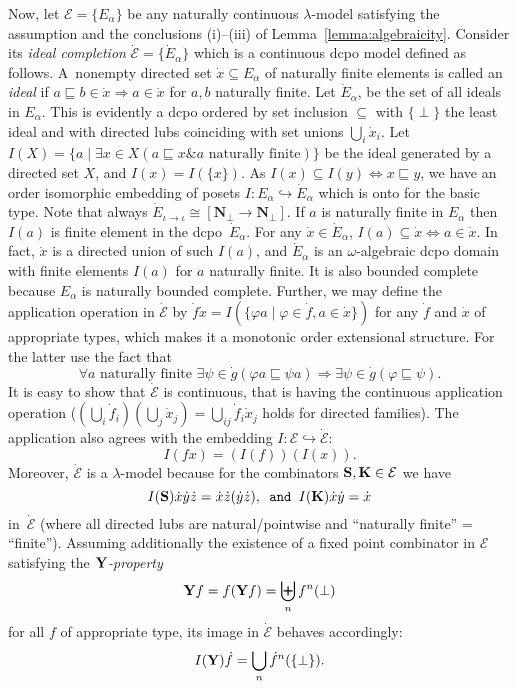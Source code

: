 \documentclass[fleqn]{LMCS}
\theoremstyle{plain}\newtheorem{satz}[thm]{Satz}
\theoremstyle{plain}\newtheorem{hyp}[thm]{Hypothesis}
\theoremstyle{plain}\newtheorem{hyps}[thm]{Hypotheses}
\theoremstyle{definition}\newtheorem{note}[thm]{Note}
\newcommand{\EE}{\mathcal{E}}
\newcommand{\setof}[1]{\{#1\}}
\newcommand{\pointwiselub}{\biguplus}
\newcommand{\arr}{\rightarrow}
\newcommand{\Arr}{\Rightarrow}
\newcommand{\Arrr}{\Longrightarrow}
\newcommand{\embed}{\hookrightarrow}
\newcommand{\AND}{\mathrel{\&}}
\newcommand{\NN}{\mathbf{N}}
\newcommand{\K}{\mbox{\bf K}}
\newcommand{\Ss}{\mbox{\bf S}}
\newcommand{\Y}{\mbox{\bf Y}}
\newcommand{\Undef}{{\perp}}
\newcommand{\dx}{\dot{x}}
\newcommand{\dy}{\dot{y}}
\newcommand{\dz}{\dot{z}}
\newcommand{\df}{\dot{f}}
\newcommand{\dg}{\dot{g}}
\newcommand{\dE}{\dot{E}}
\newcommand{\dEE}{\dot{\EE}}
\newcommand{\Id}[1]{I(#1)}
\newcommand{\?}{\mbox{?}}
\begin{document}
Now, let $\EE=\setof{E_\alpha}$ be any naturally continuous $\lambda$-model 
satisfying the assumption and the conclusions (i)--(iii) 
of Lemma~\ref{lemma:algebraicity}. 
Consider its \emph{ideal completion} $\dEE=\setof{\dE_\alpha}$ which is 
a continuous dcpo model defined as follows. 
A~nonempty directed set $\dx\subseteq E_\alpha$ 
of naturally finite elements is called an \emph{ideal} if 
$a\sqsubseteq b\in \dx\Arr a\in \dx$ 
for $a,b$ naturally finite. 
Let $\dE_\alpha$, 
be the set of all ideals in $E_\alpha$. 
This is evidently a dcpo ordered by set inclusion $\subseteq$ with 
$\setof{\Undef}$ the least ideal and with directed 
lubs coinciding with set unions $\bigcup_i \dx_i$. 
Let 
$\Id{X}=\setof{a\mid
\exists x\in X(a\sqsubseteq x\AND a\textrm{ naturally finite})}$ be the 
ideal generated by a directed set $X$, and $\Id{x}=\Id{\setof{x}}$. 
As $\Id{x}\subseteq \Id{y}\!\!\!\iff\!\!\! x\sqsubseteq y$, 
we have an order isomorphic embedding of posets $I:E_\alpha\embed\dE_\alpha$ which is 
onto for the basic type. Note that always 
$\dE_{\iota\arr\iota}\cong[\NN_\Undef\arr\NN_\Undef]$. 
If $a$ is naturally finite in $E_\alpha$ then $\Id{a}$ is finite
element in the dcpo~$\dE_\alpha$. 
For any $\dx\in\dE_\alpha$,
$\Id{a}\subseteq\dx\!\!\!\iff\!\!\! a\in\dx$. In fact, $\dx$ is a directed union of such $\Id{a}$, 
and $\dE_\alpha$ is an $\omega$-algebraic dcpo domain with finite elements 
$\Id{a}$ for $a$ naturally finite. It is also bounded complete because 
$E_\alpha$ is naturally bounded complete. 
Further, we may define the application operation in $\dEE$ by 
$\df\dx=\Id{\setof{\varphi a\mid \varphi\in\df, a\in\dx}}$ 
for any $\df$ and $\dx$ of appropriate types, 
which makes it a monotonic order extensional structure. 
For the latter use the fact that 
\[
\forall a\textrm{ naturally finite }
\exists\psi\in\dg(\varphi a\sqsubseteq\psi a)\Arrr
\exists\psi\in\dg(\varphi\sqsubseteq\psi). 
\]
It is easy to show that $\dEE$ is continuous, that is having the continuous 
application operation  
($(\bigcup_i\df_i )(\bigcup_j\dx_j )=\bigcup_{ij}\df_i\dx_j$ holds 
for directed families). 
The application also agrees with the embedding $I:\EE\embed\dEE$: 
\[
\Id{fx}=(\Id{f}) (\Id{x}). 
\]
Moreover, $\dEE$ is a $\lambda$-model because for the combinators 
$\Ss,\K\in\EE$ we have 
\[
\Id{\Ss} \dx\dy\dz=\dx\dz(\dy\dz),\texttt{ and }\Id{\K} \dx\dy=\dx
\] 
in~$\dEE$ (where all directed lubs are natural/pointwise and 
``naturally finite'' = ``finite''). 
Assuming additionally the existence of 
a fixed point combinator in $\EE$ satisfying the \emph{$\Y$-property}
\begin{equation}\label{eq:Y-property}
\Y f=f(\Y f)=\pointwiselub_n f^n(\Undef) 
\end{equation}
for all $f$ of appropriate type, its 
image in $\dEE$ behaves accordingly: 
\[
\Id{\Y}\df=\bigcup_n \df^n(\setof{\Undef}). 
\]
\end{document}
